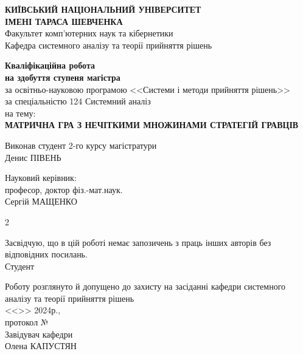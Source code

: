 \documentclass[14pt, a4paper, oneside]{extarticle}
\numberwithin{equation}{section}
\begin{document}
\begin{center}
\textbf{КИЇВСЬКИЙ НАЦІОНАЛЬНИЙ УНІВЕРСИТЕТ\\ ІМЕНІ ТАРАСА ШЕВЧЕНКА}\\ 
Факультет комп'ютерних наук та кібернетики\\
Кафедра системного аналізу та теорії прийняття рішень\\

\vfill

\textbf{\large{Кваліфікаційна робота}}\\
\textbf{на здобуття ступеня магістра}\\
за освітньо-науковою програмою <<Системи і методи прийняття рішень>>\\
за спеціальністю 124 Системний аналіз\\
на тему:\\
\textbf{МАТРИЧНА ГРА З НЕЧІТКИМИ МНОЖИНАМИ СТРАТЕГІЙ ГРАВЦІВ}

\vfill

\end{center}

\begin{flushleft}

Виконав студент 2-го курсу магістратури\\
Денис ПІВЕНЬ \hfill \underline{\hspace{3cm}}\\
\end{flushleft}

\begin{flushleft}
Науковий керівник:\\
професор, доктор фіз.-мат.наук.\\
Сергій МАЩЕНКО \hfill \underline{\hspace{3cm}}
\end{flushleft}

\vfill

\begin{multicols}{2}
  \hspace{1mm}

  \columnbreak
    Засвідчую, що в цій роботі немає запозичень з праць інших авторів без відповідних посилань.
    \\
    Студент \hfill \underline{\hspace{3cm}}

\hspace{1mm}

    Роботу розглянуто й допущено до захисту на засіданні кафедри системного аналізу та теорії прийняття рішень
    \\
    <<\underline{\hspace{1cm}}>> \underline{\hspace{3cm}} 2024р.,\\
    протокол №\underline{\hspace{1cm}}\\
    Завідувач кафедри\\
    Олена КАПУСТЯН \hfill \underline{\hspace{3cm}}
    
  
\end{multicols}
\end{document}
